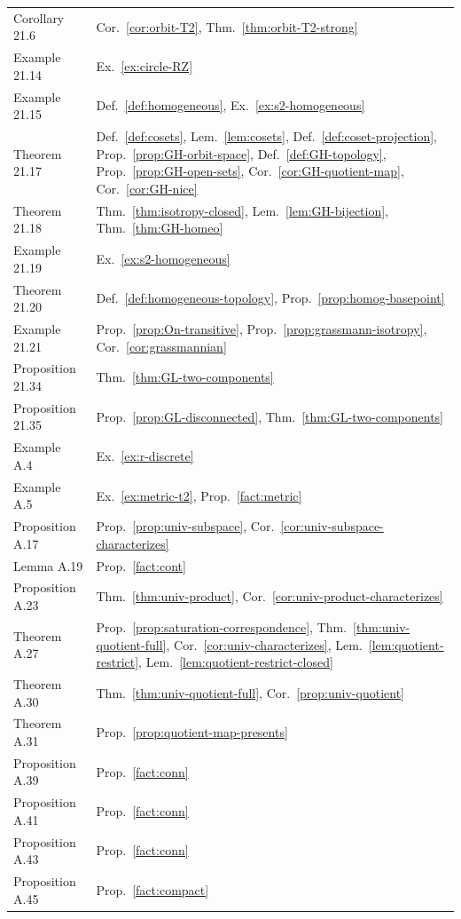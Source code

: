 \documentclass[11pt]{report}
\begin{document}
{\begin{longtable}{>{\raggedright\arraybackslash}p{3.6cm} >{\raggedright\arraybackslash}p{11.2cm}}
Corollary 21.6 & Cor.~\ref{cor:orbit-T2}, Thm.~\ref{thm:orbit-T2-strong} \\
Example 21.14 & Ex.~\ref{ex:circle-RZ} \\
Example 21.15 & Def.~\ref{def:homogeneous}, Ex.~\ref{ex:s2-homogeneous} \\
Theorem 21.17 & Def.~\ref{def:cosets}, Lem.~\ref{lem:cosets}, Def.~\ref{def:coset-projection}, Prop.~\ref{prop:GH-orbit-space}, Def.~\ref{def:GH-topology}, Prop.~\ref{prop:GH-open-sets}, Cor.~\ref{cor:GH-quotient-map}, Cor.~\ref{cor:GH-nice} \\
Theorem 21.18 & Thm.~\ref{thm:isotropy-closed}, Lem.~\ref{lem:GH-bijection}, Thm.~\ref{thm:GH-homeo} \\
Example 21.19 & Ex.~\ref{ex:s2-homogeneous} \\
Theorem 21.20 & Def.~\ref{def:homogeneous-topology}, Prop.~\ref{prop:homog-basepoint} \\
Example 21.21 & Prop.~\ref{prop:On-transitive}, Prop.~\ref{prop:grassmann-isotropy}, Cor.~\ref{cor:grassmannian} \\
Proposition 21.34 & Thm.~\ref{thm:GL-two-components} \\
Proposition 21.35 & Prop.~\ref{prop:GL-disconnected}, Thm.~\ref{thm:GL-two-components} \\
Example A.4 & Ex.~\ref{ex:r-discrete} \\
Example A.5 & Ex.~\ref{ex:metric-t2}, Prop.~\ref{fact:metric} \\
Proposition A.17 & Prop.~\ref{prop:univ-subspace}, Cor.~\ref{cor:univ-subspace-characterizes} \\
Lemma A.19 & Prop.~\ref{fact:cont} \\
Proposition A.23 & Thm.~\ref{thm:univ-product}, Cor.~\ref{cor:univ-product-characterizes} \\
Theorem A.27 & Prop.~\ref{prop:saturation-correspondence}, Thm.~\ref{thm:univ-quotient-full}, Cor.~\ref{cor:univ-characterizes}, Lem.~\ref{lem:quotient-restrict}, Lem.~\ref{lem:quotient-restrict-closed} \\
Theorem A.30 & Thm.~\ref{thm:univ-quotient-full}, Cor.~\ref{prop:univ-quotient} \\
Theorem A.31 & Prop.~\ref{prop:quotient-map-presents} \\
Proposition A.39 & Prop.~\ref{fact:conn} \\
Proposition A.41 & Prop.~\ref{fact:conn} \\
Proposition A.43 & Prop.~\ref{fact:conn} \\
Proposition A.45 & Prop.~\ref{fact:compact} \\

\end{longtable}}
\end{document}
